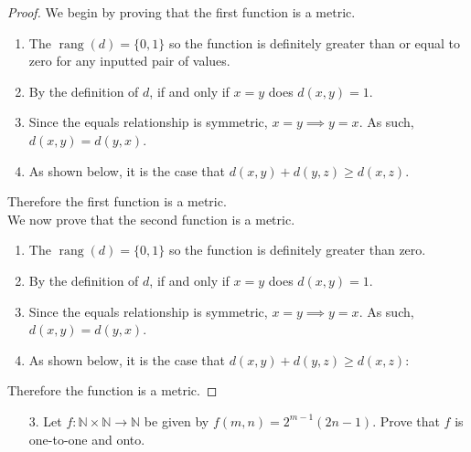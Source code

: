\documentclass[10pt]{article}
\theoremstyle{definition}
\theoremstyle{plain}
\newcommand{\N}{\mathbb{N}}
\DeclareMathOperator\rang{rang}
\begin{document}
\begin{proof}
  We begin by proving that the first function is a metric.
  \begin{enumerate}
    \item The $\rang(d)=\{0,1\}$ so the function is definitely greater than or equal to zero for any inputted pair of values.
    \item By the definition of $d$, if and only if $x=y$ does $d(x,y)=1$.
    \item Since the equals relationship is symmetric, $x=y \implies y=x$. As such, $d(x,y) = d(y,x)$.
    \item As shown below, it is the case that $d(x,y) + d(y,z) \geq d(x,z)$.
  \end{enumerate}
  Therefore the first function is a metric. \\

  We now prove that the second function is a metric.
  \begin{enumerate}
    \item The $\rang(d)=\{0,1\}$ so the function is definitely greater than zero.
    \item By the definition of $d$, if and only if $x=y$ does $d(x,y)=1$.
    \item Since the equals relationship is symmetric, $x=y \implies y=x$. As such, $d(x,y) = d(y,x)$.
    \item As shown below, it is the case that $d(x,y) + d(y,z) \geq d(x,z)$:
  \end{enumerate}
  Therefore the function is a metric.
\end{proof}



\pagebreak



\begin{enumerate}
\item[3.] Let $f: \N \times \N \to \N$ be given by $f(m,n) = 2^{m-1}(2n-1)$.  Prove that $f$ is one-to-one and onto.
\end{enumerate}
\end{document}
